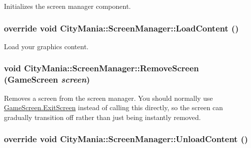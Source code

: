 Initializes the screen manager component. \hypertarget{classCityMania_1_1ScreenManager_a4bab9e90789258c162e5c2ab78aa9c67}{
\subsubsection[{LoadContent}]{\setlength{\rightskip}{0pt plus 5cm}override void CityMania::ScreenManager::LoadContent ()}}
\label{classCityMania_1_1ScreenManager_a4bab9e90789258c162e5c2ab78aa9c67}


Load your graphics content. \hypertarget{classCityMania_1_1ScreenManager_ae9d2ac095225f11261734ca461847242}{
\subsubsection[{RemoveScreen}]{\setlength{\rightskip}{0pt plus 5cm}void CityMania::ScreenManager::RemoveScreen ({\bf GameScreen} {\em screen})}}
\label{classCityMania_1_1ScreenManager_ae9d2ac095225f11261734ca461847242}


Removes a screen from the screen manager. You should normally use \hyperlink{classCityMania_1_1GameScreen_ada4a6b75da175b4286662d888eefc3e2}{GameScreen.ExitScreen} instead of calling this directly, so the screen can gradually transition off rather than just being instantly removed. \hypertarget{classCityMania_1_1ScreenManager_ae95f2d781bf379d7d5a81d1f31b776f4}{
\subsubsection[{UnloadContent}]{\setlength{\rightskip}{0pt plus 5cm}override void CityMania::ScreenManager::UnloadContent ()}}
\label{classCityMania_1_1ScreenManager_ae95f2d781bf379d7d5a81d1f31b776f4}



